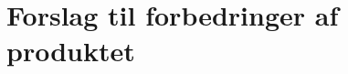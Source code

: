 \documentclass[Main]{subfiles}
\begin{document}
\section{Forslag til forbedringer af produktet}
\end{document}

